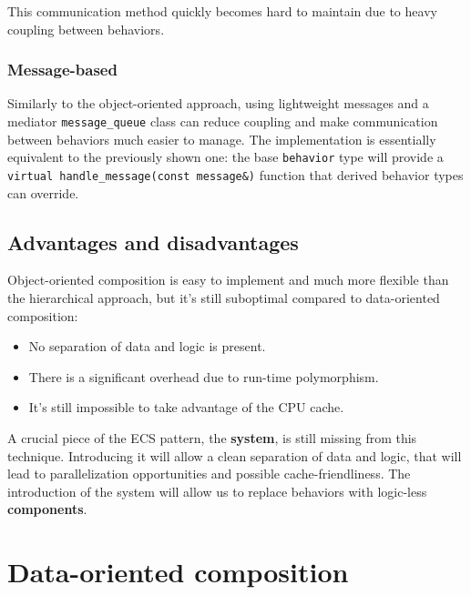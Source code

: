 \documentclass[twoside, 12pt, a4paper, openany]{book}
\begin{document}
This communication method quickly becomes hard to maintain due to heavy
coupling between behaviors.

\subsubsection{Message-based}\label{message-based-1}

Similarly to the object-oriented approach, using lightweight messages
and a mediator
\texttt{message_queue}
class can reduce coupling and make communication between behaviors much
easier to manage. The implementation is essentially equivalent to the
previously shown one: the base
\texttt{behavior}
type will provide a
\texttt{virtual handle_message(const message&)}
function that derived behavior types can override.

\subsection{Advantages and
disadvantages}\label{advantages-and-disadvantages-1}

Object-oriented composition is easy to implement and much more flexible
than the hierarchical approach, but it's still suboptimal compared to
data-oriented composition:

\begin{itemize}
\item
  No separation of data and logic is present.
\item
  There is a significant overhead due to run-time polymorphism.
\item
  It's still impossible to take advantage of the CPU cache.
\end{itemize}

A crucial piece of the ECS pattern, the \textbf{system}, is still
missing from this technique. Introducing it will allow a clean
separation of data and logic, that will lead to parallelization
opportunities and possible cache-friendliness. The introduction of the
system will allow us to replace behaviors with logic-less
\textbf{components}.

\section{Data-oriented composition}\label{data-oriented-composition}
\end{document}
